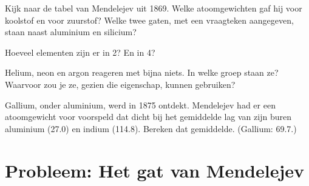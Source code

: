 \begin{exercise}[$\star\star$]\label{exo:g9:periodic-table-first-look:9}
Kijk naar de tabel van Mendelejev uit 1869. Welke atoomgewichten gaf hij
voor koolstof en voor zuurstof? Welke twee gaten, met een vraagteken
aangegeven, staan naast aluminium en silicium?
\end{exercise}

\begin{exercise}[$\star\star$]\label{exo:g9:periodic-table-first-look:10}
Hoeveel elementen zijn er in  2? En in  4?
\end{exercise}

\begin{exercise}[$\star\star\star$]\label{exo:g9:periodic-table-first-look:11}
Helium, neon en argon reageren met bijna niets. In welke groep staan
ze? Waarvoor zou je ze, gezien die eigenschap, kunnen gebruiken?
\end{exercise}

\begin{exercise}[$\star\star\star$]\label{exo:g9:periodic-table-first-look:12}
Gallium, onder aluminium, werd in 1875 ontdekt. Mendelejev had er een
atoomgewicht voor voorspeld dat dicht bij het gemiddelde lag van zijn
buren aluminium (27.0) en indium (114.8). Bereken dat gemiddelde.
(Gallium: 69.7.)
\end{exercise}

\section{Probleem: Het gat van Mendelejev}

